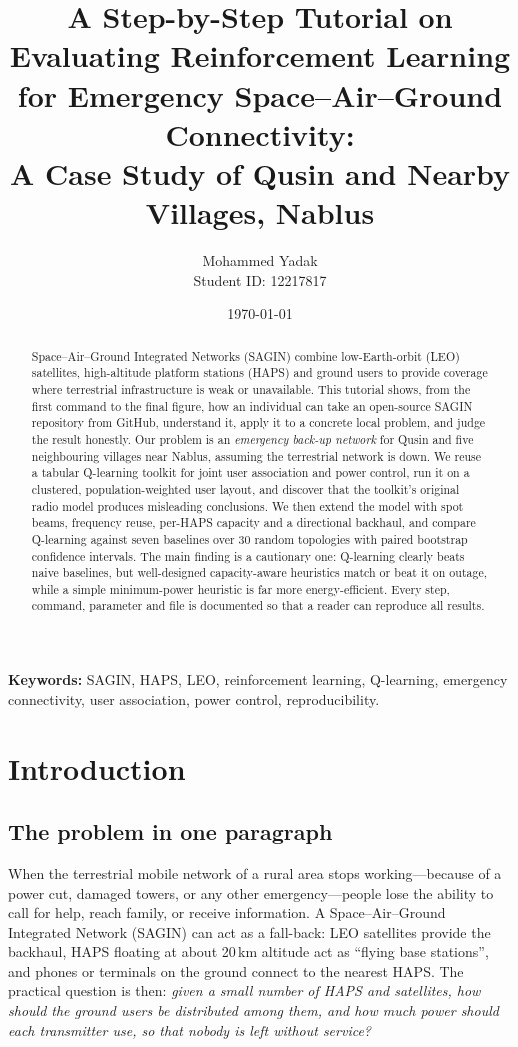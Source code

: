 \documentclass[11pt,a4paper]{article}
\title{\textbf{A Step-by-Step Tutorial on Evaluating Reinforcement Learning\\
for Emergency Space--Air--Ground Connectivity:\\
A Case Study of Qusin and Nearby Villages, Nablus}}
\author{Mohammed Yadak\\ Student ID: 12217817}
\date{\today}
\begin{document}
\maketitle

\begin{abstract}
Space--Air--Ground Integrated Networks (SAGIN) combine low-Earth-orbit (LEO) satellites, high-altitude platform stations (HAPS) and ground users to provide coverage where terrestrial infrastructure is weak or unavailable. This tutorial shows, from the first command to the final figure, how an individual can take an open-source SAGIN repository from GitHub, understand it, apply it to a concrete local problem, and judge the result honestly. Our problem is an \emph{emergency back-up network} for Qusin and five neighbouring villages near Nablus, assuming the terrestrial network is down. We reuse a tabular Q-learning toolkit for joint user association and power control, run it on a clustered, population-weighted user layout, and discover that the toolkit's original radio model produces misleading conclusions. We then extend the model with spot beams, frequency reuse, per-HAPS capacity and a directional backhaul, and compare Q-learning against seven baselines over 30 random topologies with paired bootstrap confidence intervals. The main finding is a cautionary one: Q-learning clearly beats naive baselines, but well-designed capacity-aware heuristics match or beat it on outage, while a simple minimum-power heuristic is far more energy-efficient. Every step, command, parameter and file is documented so that a reader can reproduce all results.
\end{abstract}

\noindent\textbf{Keywords:} SAGIN, HAPS, LEO, reinforcement learning, Q-learning, emergency connectivity, user association, power control, reproducibility.

\setcounter{tocdepth}{1}
\tableofcontents
\newpage

\section{Introduction}
\label{sec:intro}

\subsection{The problem in one paragraph}
When the terrestrial mobile network of a rural area stops working---because of a power cut, damaged towers, or any other emergency---people lose the ability to call for help, reach family, or receive information. A Space--Air--Ground Integrated Network (SAGIN) can act as a fall-back: LEO satellites provide the backhaul, HAPS floating at about 20\,km altitude act as ``flying base stations'', and phones or terminals on the ground connect to the nearest HAPS. The practical question is then: \emph{given a small number of HAPS and satellites, how should the ground users be distributed among them, and how much power should each transmitter use, so that nobody is left without service?}
\end{document}
